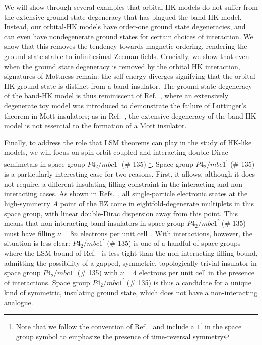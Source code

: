 \documentclass[prb,aps,amssymb,twocolumn,notitlepage]{revtex4-2}
\def\sg135{$P4_2/mbc1^\prime$ (\# 135)}
\begin{document}
We will show through several examples that orbital HK models do not suffer from the extensive ground state degeneracy that has plagued the band-HK model. 
Instead, our orbital-HK models have order-one ground state degeneracies, and can even have nondegenerate ground states for certain choices of interaction. 
We show that this removes the tendency towards magnetic ordering, rendering the ground state stable to infinitesimal Zeeman fields. 
Crucially, we show that even when the ground state degeneracy is removed by the orbital HK interaction, signatures of Mottness remain: the self-energy diverges signifying that the orbital HK ground state is distinct from a band insulator. 
The ground state degeneracy of the band-HK model is thus reminiscent of Ref.~\cite{dave2013absence}, where an extensively degenerate toy model was introduced to demonstrate the failure of Luttinger's theorem in Mott insulators; as in Ref.~\cite{dave2013absence}, the extensive degeneracy of the band HK model is not essential to the formation of a Mott insulator.

Finally, to address the role that LSM theorems can play in the study of HK-like models, we will focus on spin-orbit coupled and interacting double-Dirac semimetals in space group \sg135 \footnote{Note that we follow the convention of Ref.~\cite{bradley1972mathematical} and include a $1^\prime$ in the space group symbol to emphasize the presence of time-reversal symmetry}.
Space group $P4_2/mbc1^\prime$ (\# 135) is a particularly interesting case for two reasons.
First, it allows, although it does not require, a different insulating filling constraint in the interacting and non-interacting cases.
As shown in Refs.~\cite{wieder2016double,bradlyn2016dirac}, all single-particle electronic states at the high-symmetry $A$ point of the BZ come in eightfold-degenerate multiplets in this space group, with linear double-Dirac dispersion away from this point. 
This means that non-interacting band insulators in space group $P4_2/mbc1^\prime$ (\# 135) must have filling $\nu=8n$ electrons per unit cell~\cite{watanabe2016fillingenforced}. 
With interactions, however, the situation is less clear: $P4_2/mbc1^\prime$ (\# 135) is one of a handful of space groups where the LSM bound of Ref.~\cite{watanabe2015filling} is less tight than the non-interacting filling bound, admitting the possibility of a gapped, symmetric, topologically trivial insulator in space group $P4_2/mbc1^\prime$ (\# 135) with $\nu=4$ electrons per unit cell in the presence of interactions. 
Space group \sg135 is thus a candidate for a unique kind of symmetric, insulating ground state, which does not have a non-interacting analogue. 
\end{document}
